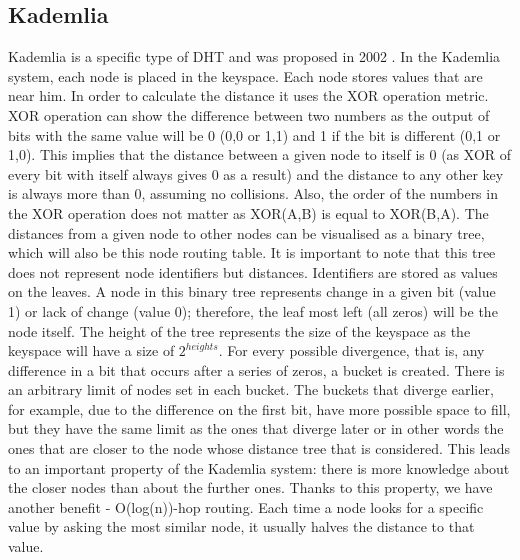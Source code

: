 \subsection{Kademlia}
Kademlia is a specific type of DHT and was proposed in 2002 \cite{kademlia}. In the Kademlia system, each node is placed in the keyspace. Each node stores values that are near him. In order to calculate the distance it uses the XOR operation metric. XOR operation can show the difference between two numbers as the output of bits with the same value will be 0 (0,0 or 1,1)  and 1 if the bit is different (0,1 or 1,0). This implies that the distance between a given node to itself is 0 (as XOR of every bit with itself always gives 0 as a result) and the distance to any other key is always more than 0, assuming no collisions. Also, the order of the numbers in the XOR operation does not matter as XOR(A,B) is equal to XOR(B,A).
The distances from a given node to other nodes can be visualised as a binary tree, which will also be this node routing table. It is important to note that this tree does not represent node identifiers but distances. Identifiers are stored as values on the leaves. A node in this binary tree represents change in a given bit (value 1) or lack of change (value 0); therefore, the leaf most left (all zeros) will be the node itself. The height of the tree represents the size of the keyspace as the keyspace will have a size of $2^{heights}$.
For every possible divergence, that is, any difference in a bit that occurs after a series of zeros, a bucket is created. There is an arbitrary limit of nodes set in each bucket. The buckets that diverge earlier, for example, due to the difference on the first bit, have more possible space to fill, but they have the same limit as the ones that diverge later or in other words the ones that are closer to the node whose distance tree that is considered. This leads to an important property of the Kademlia system: there is more knowledge about the closer nodes than about the further ones. Thanks to this property, we have another benefit - O(log(n))-hop routing. Each time a node looks for a specific value by asking the most similar node, it usually halves the distance to that value.



